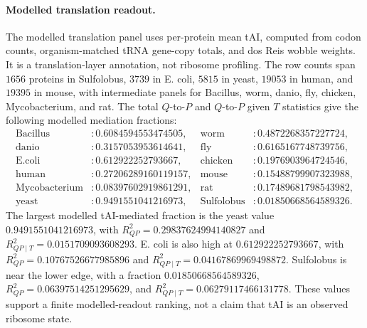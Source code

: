 \paragraph{Modelled translation readout.}
The modelled translation panel uses per-protein mean tAI, computed from codon counts, organism-matched tRNA gene-copy totals, and dos Reis wobble weights.  It is a translation-layer annotation, not ribosome profiling.  The row counts span $1656$ proteins in Sulfolobus, $3739$ in E. coli, $5815$ in yeast, $19053$ in human, and $19395$ in mouse, with intermediate panels for Bacillus, worm, danio, fly, chicken, Mycobacterium, and rat.  The total $Q$-to-$P$ and $Q$-to-$P$ given $T$ statistics give the following modelled mediation fractions:
$$
\begin{aligned}
\mathrm{Bacillus} &: 0.6084594553474505, & \mathrm{worm} &: 0.4872268357227724,\\
\mathrm{danio} &: 0.3157053953614641, & \mathrm{fly} &: 0.6165167748739756,\\
\mathrm{E.coli} &: 0.612922252793667, & \mathrm{chicken} &: 0.1976903964724546,\\
\mathrm{human} &: 0.27206289160119157, & \mathrm{mouse} &: 0.15488799907323988,\\
\mathrm{Mycobacterium} &: 0.08397602919861291, & \mathrm{rat} &: 0.17489681798543982,\\
\mathrm{yeast} &: 0.9491551041216973, & \mathrm{Sulfolobus} &: 0.01850668564589326.
\end{aligned}
$$
The largest modelled tAI-mediated fraction is the yeast value $0.9491551041216973$, with $R^{2}_{QP}=0.29837624994140827$ and $R^{2}_{QP\mid T}=0.0151709093608293$.  E. coli is also high at $0.612922252793667$, with $R^{2}_{QP}=0.10767526677985896$ and $R^{2}_{QP\mid T}=0.04167869969498872$.  Sulfolobus is near the lower edge, with a fraction $0.01850668564589326$, $R^{2}_{QP}=0.06397514251295629$, and $R^{2}_{QP\mid T}=0.06279117466131778$.  These values support a finite modelled-readout ranking, not a claim that tAI is an observed ribosome state.


